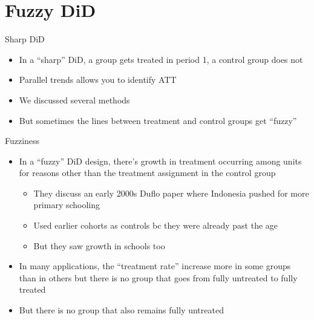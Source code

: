 \documentclass{beamer}
\begin{document}
\section{Fuzzy DiD}





\begin{frame}{Sharp DiD}

\begin{itemize}
\item In a ``sharp'' DiD, a group gets treated in period 1, a control group does not
\item Parallel trends allows you to identify ATT
\item We discussed several methods
\item But sometimes the lines between treatment and control groups get ``fuzzy''
\end{itemize}

\end{frame}

\begin{frame}{Fuzziness}

\begin{itemize}
\item In a ``fuzzy'' DiD design, there's growth in treatment occurring among units for reasons other than the treatment assignment in the control group
	\begin{itemize}
	\item They discuss an early 2000s Duflo paper where Indonesia pushed for more primary schooling
	\item Used earlier cohorts as controls bc they were already past the age
	\item But they saw growth in schools too
	\end{itemize}
\item In many applications, the ``treatment rate'' increase more in some groups than in others but there is no group that goes from fully untreated to fully treated
\item But there is no group that also remains fully untreated

\end{itemize}

\end{frame}
\end{document}
